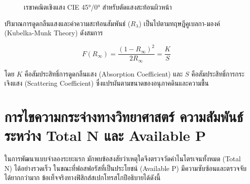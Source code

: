 \documentclass[12pt,a4paper,oneside]{book}
\begin{document}
\begin{figure}[ht]
\centering
{}
\caption{เรขาคณิตเชิงแสง CIE 45°/0° สำหรับตัดแสงสะท้อนผิวหน้า}\label{fig:cie_geometry}
\end{figure}

ปริมาณการดูดกลืนแสงและค่าความสะท้อนสัมพันธ์ ($R_\lambda$) เป็นไปตามทฤษฎีคูเบลกา-มองค์ (Kubelka-Munk Theory) ดังสมการ

\begin{equation}
F(R_\infty) = \frac{(1 - R_\infty)^2}{2 R_\infty} = \frac{K}{S}
\end{equation}

โดย $K$ คือสัมประสิทธิ์การดูดกลืนแสง (Absorption Coefficient) และ $S$ คือสัมประสิทธิ์การกระเจิงแสง (Scattering Coefficient) ซึ่งแปรผันตามขนาดของอนุภาคดินและความชื้น

\section{การไขความกระจ่างทางวิทยาศาสตร์ ความสัมพันธ์ระหว่าง Total N และ Available P}
ในการพัฒนาแบบจำลองระยะแรก มักพบข้อสงสัยว่าเหตุใดจึงตรวจวัดค่าไนโตรเจนทั้งหมด (Total N) ได้อย่างรวดเร็ว ในขณะที่ฟอสฟอรัสที่เป็นประโยชน์ (Available P) มีความซับซ้อนและตรวจจับได้ยากกว่ามาก ข้อเท็จจริงทางฟิสิกส์สเปกโทรสโกปีอธิบายได้ดังนี้
\end{document}
